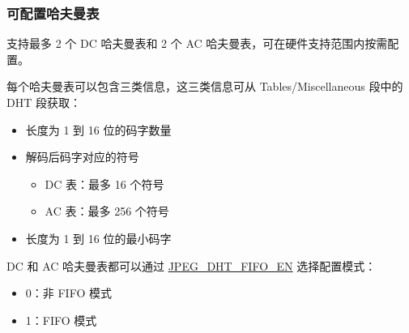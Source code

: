 \documentclass[main\_\_CN.tex]{subfiles}
\begin{document}
\subsubsection{可配置哈夫曼表}
\label{sec:jpegcodec-dec-huffman}

\chipname{} 支持最多 2 个 DC 哈夫曼表和 2 个 AC 哈夫曼表，可在硬件支持范围内按需配置。

每个哈夫曼表可以包含三类信息，这三类信息可从 Tables/Miscellaneous 段中的 DHT 段获取：
\begin{itemize}
    \item 长度为 1 到 16 位的码字数量
    \item 解码后码字对应的符号
    \begin{itemize}
        \item DC 表：最多 16 个符号
        \item AC 表：最多 256 个符号
    \end{itemize}
    \item 长度为 1 到 16 位的最小码字
\end{itemize}

DC 和 AC 哈夫曼表都可以通过 \hyperref[fielddesc:JPEGDHTFIFOEN]{JPEG\_DHT\_FIFO\_EN} 选择配置模式：
\begin{itemize}
    \item 0：非 FIFO 模式
    \item 1：FIFO 模式
\end{itemize}
\end{document}
